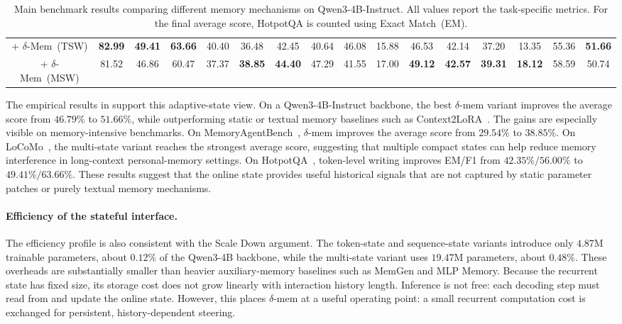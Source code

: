 \documentclass{llmxive}
\begin{document}
\begin{table}[tbp]
{\begin{tabular}{@{}cccccccccccccccc@{}}
    \quad + $\delta$-Mem~(TSW) & \textbf{82.99} & \textbf{49.41} & \textbf{63.66} & 40.40 & 36.48 & 42.45 & 40.64 & 46.08 & 15.88 & 46.53 & 42.14 & 37.20 & 13.35 & 55.36 & \textbf{51.66} \\
    \quad + $\delta$-Mem~(MSW) & 81.52 & 46.86 & 60.47 & 37.37 & \textbf{38.85} & \textbf{44.40} & 47.29 & 41.55 & 17.00 & \textbf{49.12} & \textbf{42.57} & \textbf{39.31} & \textbf{18.12} & 58.59 & 50.74 \\
    \bottomrule
    \end{tabular}%
    }
\caption{Main benchmark results comparing different memory mechanisms on Qwen3-4B-Instruct. All values report the task-specific metrics. For the final average score, HotpotQA is counted using Exact Match~(EM).}
\label{tab:delta-mem-baseline}
\end{table}


The empirical results in  support this adaptive-state view. On a Qwen3-4B-Instruct backbone, the best $\delta$-mem variant improves the average score from $46.79\%$ to $51.66\%$, while outperforming static or textual memory baselines such as Context2LoRA~\citep{back2026understanding,hu2021lora}. The gains are especially visible on memory-intensive benchmarks. On MemoryAgentBench~\citep{hu2025evaluating}, $\delta$-mem improves the average score from $29.54\%$ to $38.85\%$. On LoCoMo~\citep{maharana2024longmemory}, the multi-state variant reaches the strongest average score, suggesting that multiple compact states can help reduce memory interference in long-context personal-memory settings. On HotpotQA~\citep{yang2018hotpotqa}, token-level writing improves EM/F1 from $42.35\%/56.00\%$ to $49.41\%/63.66\%$. These results suggest that the online state provides useful historical signals that are not captured by static parameter patches or purely textual memory mechanisms.

\paragraph{Efficiency of the stateful interface.}
The efficiency profile is also consistent with the Scale Down argument. The token-state and sequence-state variants introduce only $4.87$M trainable parameters, about $0.12\%$ of the Qwen3-4B backbone, while the multi-state variant uses $19.47$M parameters, about $0.48\%$. These overheads are substantially smaller than heavier auxiliary-memory baselines such as MemGen and MLP Memory. Because the recurrent state has fixed size, its storage cost does not grow linearly with interaction history length. Inference is not free: each decoding step must read from and update the online state. However, this places $\delta$-mem at a useful operating point: a small recurrent computation cost is exchanged for persistent, history-dependent steering.
\end{document}
